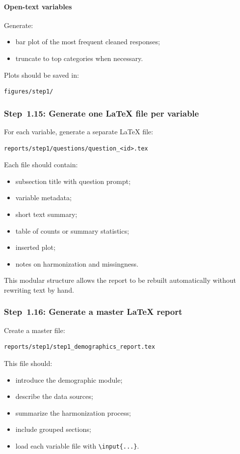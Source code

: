 \paragraph{Open-text variables}
Generate:
\begin{itemize}
    \item bar plot of the most frequent cleaned responses;
    \item truncate to top categories when necessary.
\end{itemize}

Plots should be saved in:
\begin{verbatim}
figures/step1/
\end{verbatim}

\subsubsection{Step~1.15: Generate one \LaTeX{} file per variable}
For each variable, generate a separate \LaTeX{} file:
\begin{verbatim}
reports/step1/questions/question_<id>.tex
\end{verbatim}

Each file should contain:
\begin{itemize}
    \item subsection title with question prompt;
    \item variable metadata;
    \item short text summary;
    \item table of counts or summary statistics;
    \item inserted plot;
    \item notes on harmonization and missingness.
\end{itemize}

This modular structure allows the report to be rebuilt automatically without rewriting text by hand.

\subsubsection{Step~1.16: Generate a master \LaTeX{} report}
Create a master file:
\begin{verbatim}
reports/step1/step1_demographics_report.tex
\end{verbatim}

This file should:
\begin{itemize}
    \item introduce the demographic module;
    \item describe the data sources;
    \item summarize the harmonization process;
    \item include grouped sections;
    \item load each variable file with \texttt{\textbackslash input\{...\}}.
\end{itemize}


